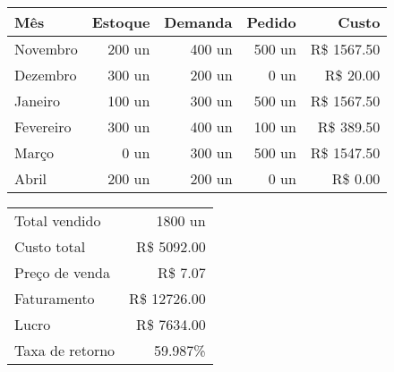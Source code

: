 
	\begin{table}[ht]
		\centering
		\begin{tabular}{lrrrr}
			\toprule
			Mês       & Estoque & Demanda & Pedido &       Custo \\
			\midrule
			Novembro  &  200 un &  400 un & 500 un & R\$ 1567.50 \\
			Dezembro  &  300 un &  200 un &   0 un & R\$   20.00 \\
			Janeiro   &  100 un &  300 un & 500 un & R\$ 1567.50 \\
			Fevereiro &  300 un &  400 un & 100 un & R\$  389.50 \\
			Março     &    0 un &  300 un & 500 un & R\$ 1547.50 \\
			Abril     &  200 un &  200 un &   0 un & R\$    0.00 \\
			\bottomrule
		\end{tabular}
	\end{table}

	\begin{table}[ht]
		\centering
		\begin{tabular}{lr}
			\toprule
			Total vendido   &      1800 un    \\
			Custo total     & R\$  5092.00    \\
			Preço de venda  & R\$     7.07    \\
			Faturamento     & R\$ 12726.00    \\
			Lucro           & R\$  7634.00    \\
			Taxa de retorno &        59.987\% \\
			\bottomrule
		\end{tabular}
	\end{table}

